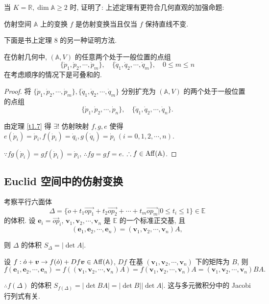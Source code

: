 \documentclass{ctexart}
\begin{document}
当 $K=\mathbb{R},\dim\mathbb{A}\geq2$ 时, \cite[p41]{geometry} 证明了: 上述定理有更符合几何直观的加强命题:
\begin{theorem}
    仿射空间 $\mathbb{A}$ 上的变换 $f$ 是仿射变换当且仅当 $f$ 保持直线不变.
\end{theorem}
下面是书上定理 8 的另一种证明方法.
\begin{theorem}[书上的定理 8]\label{t3.8}
    在仿射几何中, $(\mathbb{A},V)$ 的任意两个处于一般位置的点组
    \[\{\dot{p}_1,\dot{p}_2,\cdots,\dot{p}_m\},\quad\{\dot{q}_1,\dot{q}_2,\cdots,\dot{q}_m\},\quad0\leq m\leq n\]
    在考虑顺序的情况下是可叠和的.
\end{theorem}
\begin{proof}
    将 $\{\dot{p}_1,\dot{p}_2,\cdots,\dot{p}_m\},\{\dot{q}_1,\dot{q}_2,\cdots,\dot{q}_m\}$ 分别扩充为 $(\mathbb{A},V)$ 的两个处于一般位置的点组
    \[\{\dot{p}_1,\dot{p}_2,\cdots,\dot{p}_n\},\quad\{\dot{q}_1,\dot{q}_2,\cdots,\dot{q}_n\}.\]

    由定理 \ref{t1.7} 得 $\exists!$ 仿射映射 $f,g,e$ 使得 $e(\dot{p}_i)=\dot{p}_i,f(\dot{p}_i)=\dot{q}_i,g(\dot{q}_i)=\dot{p}_i\ (i=0,1,2,\cdots,n)$.

    $\because fg(\dot{p}_i)=gf(\dot{p}_i)=\dot{p}_i$, $\therefore fg=gf=e$. $\therefore f\in\operatorname{Aff} (\mathbb{A})$.
\end{proof}
\subsection{Euclid 空间中的仿射变换}
考察平行六面体
\[\Delta=\{\dot{o}+t_1\overrightarrow{op_1}+t_2\overrightarrow{op_2}+\cdots+t_m\overrightarrow{op_m}|0\leq t_i\leq1\}\in\mathbb{E}\]
的体积. 设 $\boldsymbol{e}_i=\overrightarrow{op}_i$, $\boldsymbol{v}_1,\boldsymbol{v}_2,\cdots,\boldsymbol{v}_n$ 是 $\mathbb{E}$ 的一个标准正交基, 且
\[(\boldsymbol{e}_1,\boldsymbol{e}_2,\cdots,\boldsymbol{e}_n)=(\boldsymbol{v}_1,\boldsymbol{v}_2,\cdots,\boldsymbol{v}_n)A,\]

则 $\Delta$ 的体积 $S_\Delta=|\det A|$.

设 $f:\dot{o}+\boldsymbol{v}\to f(\dot{o})+Df\boldsymbol{v}\in\operatorname{Aff} (\mathbb{A})$, $Df$ 在基 $(\boldsymbol{v}_1,\boldsymbol{v}_2,\cdots,\boldsymbol{v}_n)$ 下的矩阵为 $B$, 则
\[f(\boldsymbol{e}_1,\boldsymbol{e}_2,\cdots,\boldsymbol{e}_n)=f((\boldsymbol{v}_1,\boldsymbol{v}_2,\cdots,\boldsymbol{v}_n)A)=f(\boldsymbol{v}_1,\boldsymbol{v}_2,\cdots,\boldsymbol{v}_n)A=(\boldsymbol{v}_1,\boldsymbol{v}_2,\cdots,\boldsymbol{v}_n)BA.\]

$\therefore f(\Delta)$ 的体积 $S_{f(\Delta)}=|\det BA|=|\det B||\det A|$. 这与多元微积分中的 Jacobi 行列式有关.
\end{document}
